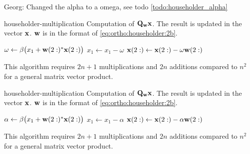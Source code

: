 \begin{todo}
  Georg: Changed the alpha to a omega, see todo \ref{todo:householder_alpha}
\begin{Algorithm}{householder-multiplication}
  Computation of $\mathbf Q_{\mathbf w}\mathbf x$. The result is updated in the vector
  $\mathbf x$. $\mathbf w$ is in the format of \eqref{eq:ortho:householder:2b}.

  \hrulefill
  \vspace*{2mm}
  \begin{algorithmic}[1]
    \State $\omega \gets \beta \bigl( x_1 + \mathbf w(2:)^*\mathbf x(2:)\bigr)$
    \State $x_1 \gets x_1 - \omega$
    \State $\mathbf x(2:) \gets \mathbf x(2:) - \omega \mathbf w(2:)$
    \EndIf
    \EndFunction
  \end{algorithmic}
   \hrulefill

   This algorithm requires $2n+1$ multiplications and $2n$ additions
   compared to $n^2$ for a general matrix vector product.
\end{Algorithm}
\end{todo}
\begin{Algorithm}{householder-multiplication}
  Computation of $\mathbf Q_{\mathbf w}\mathbf x$. The result is updated in the vector
  $\mathbf x$. $\mathbf w$ is in the format of \eqref{eq:ortho:householder:2b}.

  \hrulefill
  \vspace*{2mm}
  \begin{algorithmic}[1]
    \State $\alpha \gets \beta \bigl( x_1 + \mathbf w(2:)^*\mathbf x(2:)\bigr)$
    \State $x_1 \gets x_1 - \alpha$
    \State $\mathbf x(2:) \gets \mathbf x(2:) - \alpha \mathbf w(2:)$
    \EndIf
    \EndFunction
  \end{algorithmic}
   \hrulefill

   This algorithm requires $2n+1$ multiplications and $2n$ additions
   compared to $n^2$ for a general matrix vector product.
\end{Algorithm}

